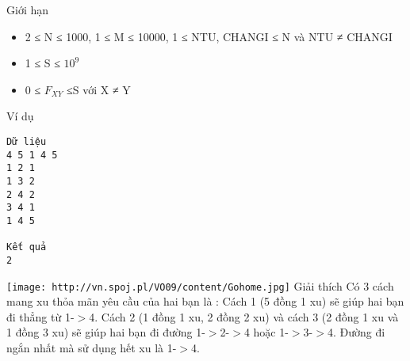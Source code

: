 Giới hạn
\begin{itemize}
	\item     2 ≤ N ≤ 1000, 1 ≤ M ≤ 10000, 1 ≤ NTU, CHANGI ≤ N và NTU ≠ CHANGI   
	\item     1 ≤ S ≤ $10^{9}$
	\item     0 ≤ $F_{XY}$    ≤S với X ≠ Y   
\end{itemize}
Ví dụ
\begin{verbatim}
Dữ liệu
4 5 1 4 5
1 2 1
1 3 2
2 4 2
3 4 1
1 4 5	

Kết quả
2
\end{verbatim}
\texttt{[image: http://vn.spoj.pl/VO09/content/Gohome.jpg]}
Giải thích
Có 3 cách mang xu thỏa mãn yêu cầu của hai bạn là : Cách 1 (5 đồng 1 xu) sẽ giúp hai bạn đi thẳng từ 1-$>$4. Cách 2 (1 đồng 1 xu, 2 đồng 2 xu) và cách 3 (2 đồng 1 xu và 1 đồng 3 xu) sẽ giúp hai bạn đi đường 1-$>$2-$>$4 hoặc 1-$>$3-$>$4. Đường đi ngắn nhất mà sử dụng hết xu là 1-$>$4.